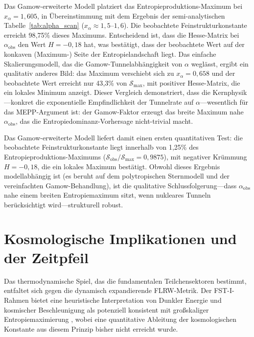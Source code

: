\documentclass[12pt,a4paper]{article}
\theoremstyle{remark}
\begin{document}
Das Gamow-erweiterte Modell platziert das Entropieproduktions-Maximum bei $x_\alpha = 1{,}605$, in \"Ubereinstimmung mit dem Ergebnis der semi-analytischen Tabelle~\ref{tab:alpha_scan} ($x_\alpha \approx 1{,}5$--$1{,}6$). Die beobachtete Feinstrukturkonstante erreicht 98{,}75\% dieses Maximums. Entscheidend ist, dass die Hesse-Matrix bei $\alpha_{\text{obs}}$ den Wert $H = -0{,}18$ hat, was best\"atigt, dass der beobachtete Wert auf der konkaven (Maximum-) Seite der Entropielandschaft liegt. Das einfache Skalierungsmodell, das die Gamow-Tunnelabh\"angigkeit von $\alpha$ wegl\"asst, ergibt ein qualitativ anderes Bild: das Maximum verschiebt sich zu $x_\alpha = 0{,}658$ und der beobachtete Wert erreicht nur 43{,}3\% von $\mathcal{S}_{\max}$, mit positiver Hesse-Matrix, die ein lokales Minimum anzeigt. Dieser Vergleich demonstriert, dass die Kernphysik---konkret die exponentielle Empfindlichkeit der Tunnelrate auf $\alpha$---wesentlich f\"ur das MEPP-Argument ist: der Gamow-Faktor erzeugt das breite Maximum nahe $\alpha_{\text{obs}}$, das die Entropiedominanz-Vorhersage nicht-trivial macht.

Das Gamow-erweiterte Modell liefert damit einen ersten quantitativen Test: die beobachtete Feinstrukturkonstante liegt innerhalb von 1{,}25\% des Entropieproduktions-Maximums ($\mathcal{S}_{\text{obs}}/\mathcal{S}_{\max} = 0{,}9875$), mit negativer Kr\"ummung $H = -0{,}18$, die ein lokales Maximum best\"atigt. Obwohl dieses Ergebnis modellabh\"angig ist (es beruht auf dem polytropischen Sternmodell und der vereinfachten Gamow-Behandlung), ist die qualitative Schlussfolgerung---dass $\alpha_{\text{obs}}$ nahe einem breiten Entropiemaximum sitzt, wenn nukleares Tunneln ber\"ucksichtigt wird---strukturell robust.

\section{Kosmologische Implikationen und der Zeitpfeil}
\label{sec:cosmology}

Das thermodynamische Spiel, das die fundamentalen Teilchensektoren bestimmt, entfaltet sich gegen die dynamisch expandierende FLRW-Metrik. Der FST-I-Rahmen bietet eine heuristische Interpretation von Dunkler Energie und kosmischer Beschleunigung als potenziell konsistent mit gro\ss{}skaliger Entropiemaximierung \citep{HiggsVEV2024}, wobei eine quantitative Ableitung der kosmologischen Konstante aus diesem Prinzip bisher nicht erreicht wurde.
\end{document}
